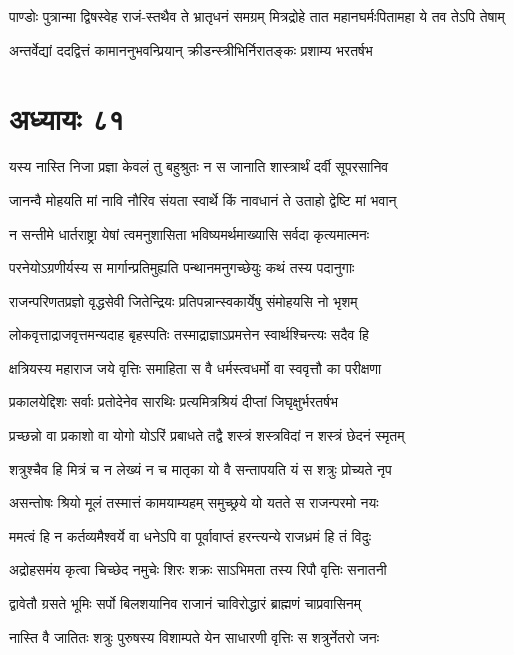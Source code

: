 \twolineshloka
{पाण्डोः पुत्रान्मा द्विषस्वेह राजं-स्तथैव ते भ्रातृधनं समग्रम्}
{मित्रद्रोहे तात महानघर्मःपितामहा ये तव तेऽपि तेषाम्}


\twolineshloka
{अन्तर्वेद्यां ददद्वित्तं कामाननुभवन्प्रियान्}
{क्रीडन्स्त्रीभिर्निरातङ्कः प्रशाम्य भरतर्षभ}


\chapter{अध्यायः ८१}
\twolineshloka
{यस्य नास्ति निजा प्रज्ञा केवलं तु बहुश्रुतः}
{न स जानाति शास्त्रार्थं दर्वी सूपरसानिव}


\twolineshloka
{जानन्वै मोहयति मां नावि नौरिव संयता}
{स्वार्थे किं नावधानं ते उताहो द्वेष्टि मां भवान्}


\twolineshloka
{न सन्तीमे धार्तराष्ट्रा येषां त्वमनुशासिता}
{भविष्यमर्थमाख्यासि सर्वदा कृत्यमात्मनः}


\twolineshloka
{परनेयोऽग्रणीर्यस्य स मार्गान्प्रतिमुह्यति}
{पन्थानमनुगच्छेयुः कथं तस्य पदानुगाः}


\twolineshloka
{राजन्परिणतप्रज्ञो वृद्धसेवी जितेन्द्रियः}
{प्रतिपन्नान्स्वकार्येषु संमोहयसि नो भृशम्}


\twolineshloka
{लोकवृत्ताद्राजवृत्तमन्यदाह बृहस्पतिः}
{तस्माद्राज्ञाऽप्रमत्तेन स्वार्थश्चिन्त्यः सदैव हि}


\twolineshloka
{क्षत्रियस्य महाराज जये वृत्तिः समाहिता}
{स वै धर्मस्त्वधर्मो वा स्ववृत्तौ का परीक्षणा}


\twolineshloka
{प्रकालयेद्दिशः सर्वाः प्रतोदेनेव सारथिः}
{प्रत्यमित्रश्रियं दीप्तां जिघृक्षुर्भरतर्षभ}


\twolineshloka
{प्रच्छन्नो वा प्रकाशो वा योगो योऽरिं प्रबाधते}
{तद्वै शस्त्रं शस्त्रविदां न शस्त्रं छेदनं स्मृतम्}


\twolineshloka
{शत्रुश्चैव हि मित्रं च न लेख्यं न च मातृका}
{यो वै सन्तापयति यं स शत्रुः प्रोच्यते नृप}


\twolineshloka
{असन्तोषः श्रियो मूलं तस्मात्तं कामयाम्यहम्}
{समुच्छ्रये यो यतते स राजन्परमो नयः}


\twolineshloka
{ममत्वं हि न कर्तव्यमैश्वर्ये वा धनेऽपि वा}
{पूर्वावाप्तं हरन्त्यन्ये राजध्रमं हि तं विदुः}


\twolineshloka
{अद्रोहसमंय कृत्वा चिच्छेद नमुचेः शिरः}
{शक्रः साऽभिमता तस्य रिपौ वृत्तिः सनातनी}


\twolineshloka
{द्वावेतौ ग्रसते भूमिः सर्पो बिलशयानिव}
{राजानं चाविरोद्धारं ब्राह्मणं चाप्रवासिनम्}


\twolineshloka
{नास्ति वै जातितः शत्रुः पुरुषस्य विशाम्पते}
{येन साधारणी वृत्तिः स शत्रुर्नेतरो जनः}


